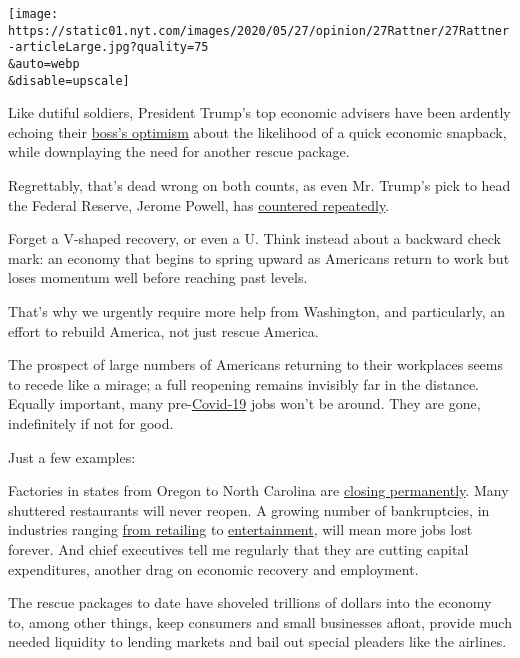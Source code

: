 \texttt{[image: https://static01.nyt.com/images/2020/05/27/opinion/27Rattner/27Rattner-articleLarge.jpg?quality=75\\\&auto=webp\\\&disable=upscale]}

Like dutiful soldiers, President Trump's top economic advisers have been
ardently echoing their
\href{https://www.nytimes.com/aponline/2020/05/24/business/bc-us-election-2020-trump-2021-comeback.html}{boss's
optimism} about the likelihood of a quick economic snapback, while
downplaying the need for another rescue package.

Regrettably, that's dead wrong on both counts, as even Mr. Trump's pick
to head the Federal Reserve, Jerome Powell, has
\href{https://www.nytimes.com/2020/05/19/us/politics/mnuchin-powell-senate-hearing.html}{countered
repeatedly}.

Forget a V-shaped recovery, or even a U. Think instead about a backward
check mark: an economy that begins to spring upward as Americans return
to work but loses momentum well before reaching past levels.

That's why we urgently require more help from Washington, and
particularly, an effort to rebuild America, not just rescue America.

The prospect of large numbers of Americans returning to their workplaces
seems to recede like a mirage; a full reopening remains invisibly far in
the distance. Equally important, many
pre-\href{https://www.nytimes.com/2020/05/28/business/economy/coronavirus-stimulus-unemployment.html}{Covid-19}
jobs won't be around. They are gone, indefinitely if not for good.

Just a few examples:

Factories in states from Oregon to North Carolina are
\href{https://www.wsj.com/articles/factories-close-for-good-as-coronavirus-cuts-demand-11589122800}{closing
permanently}. Many shuttered restaurants will never reopen. A growing
number of bankruptcies, in industries ranging
\href{https://www.nytimes.com/2020/04/21/business/coronavirus-department-stores-neiman-marcus.html?searchResultPosition=3}{from
retailing} to
\href{https://www.wsj.com/articles/owner-of-cmx-cinemas-files-for-bankruptcy-protection-11587942170}{entertainment},
will mean more jobs lost forever. And chief executives tell me regularly
that they are cutting capital expenditures, another drag on economic
recovery and employment.

The rescue packages to date have shoveled trillions of dollars into the
economy to, among other things, keep consumers and small businesses
afloat, provide much needed liquidity to lending markets and bail out
special pleaders like the airlines.

